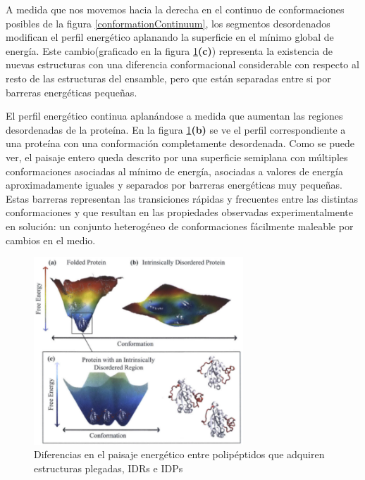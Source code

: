 A medida que nos movemos hacia la derecha en el continuo de conformaciones posibles de la figura \ref{conformationContinuum}, los segmentos desordenados 
modifican el perfil energético aplanando la superficie en el mínimo global de energía. 
Este cambio(graficado en la figura \ref{idp-folded-EnergyLandscape}\textbf{(c)}) representa la existencia de nuevas estructuras con una diferencia conformacional considerable con respecto al resto de las estructuras del ensamble, 
pero que están separadas entre si por barreras energéticas pequeñas. 

El perfil energético continua aplanándose a medida que aumentan las regiones desordenadas de la proteína. En la figura \ref{idp-folded-EnergyLandscape}\textbf{(b)} se ve el perfil 
correspondiente a una proteína con una conformación completamente desordenada. 
Como se puede ver, el paisaje entero queda descrito por una superficie semiplana con múltiples conformaciones asociadas al mínimo de energía, 
asociadas a valores de energía aproximadamente iguales y separados por barreras energéticas muy pequeñas.
Estas barreras representan las transiciones rápidas y frecuentes entre las distintas conformaciones y que resultan en las propiedades observadas experimentalmente
en solución: un conjunto heterogéneo de conformaciones fácilmente maleable por cambios en el medio. 

\begin{figure}[h]
\centering
\includegraphics[width=0.7\textwidth]{img/idp-folded-EnLandscape.png} 
\caption{Diferencias en el paisaje energético entre polipéptidos que adquiren estructuras plegadas, IDRs e IDPs }
\label{idp-folded-EnergyLandscape}
\end{figure}


